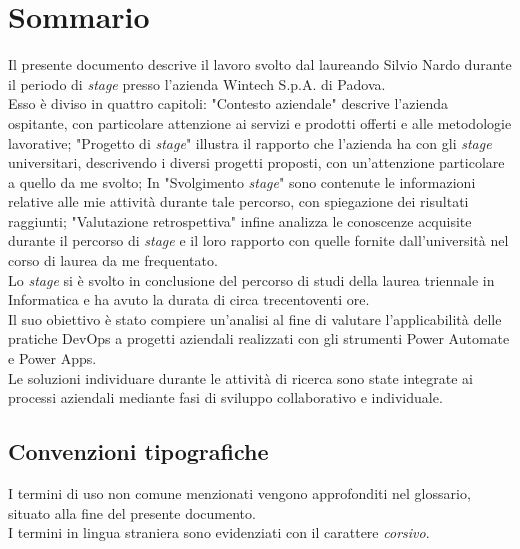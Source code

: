 \cleardoublepage
{}
{}
\begingroup
\let\clearpage\relax
\let\cleardoublepage\relax
\let\cleardoublepage\relax

\chapter*{Sommario}

Il presente documento descrive il lavoro svolto dal laureando Silvio Nardo durante il periodo di \emph{stage} presso l'azienda Wintech S.p.A. di Padova.\\
Esso è diviso in quattro capitoli: "Contesto aziendale" descrive l'azienda ospitante, con particolare attenzione ai servizi e prodotti offerti e alle metodologie lavorative; "Progetto di \emph{stage}" illustra il rapporto che l'azienda ha con gli \emph{stage} universitari, descrivendo i diversi progetti proposti, con un'attenzione particolare a quello da me svolto; In "Svolgimento \emph{stage}" sono contenute le informazioni relative alle mie attività durante tale percorso, con spiegazione dei risultati raggiunti; "Valutazione retrospettiva" infine analizza le conoscenze acquisite durante il percorso di \emph{stage} e il loro rapporto con quelle fornite dall'università nel corso di laurea da me frequentato.\\
Lo \emph{stage} si è svolto in conclusione del percorso di studi della laurea triennale in Informatica e ha avuto la durata di circa trecentoventi ore.\\
Il suo obiettivo è stato compiere un'analisi al fine di valutare l'applicabilità delle pratiche DevOps a progetti aziendali realizzati con gli strumenti Power Automate e Power Apps.\\
Le soluzioni individuare durante le attività di ricerca sono state integrate ai processi aziendali mediante fasi di sviluppo collaborativo e individuale.

\section*{Convenzioni tipografiche}
I termini di uso non comune menzionati vengono approfonditi nel glossario, situato alla fine del presente documento.\\
I termini in lingua straniera sono evidenziati con il carattere \emph{corsivo}.





\endgroup

\vfill
